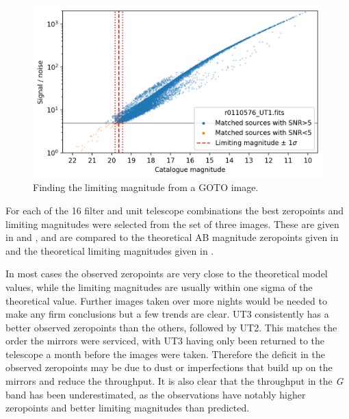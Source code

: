 \begin{colsection}
\begin{colsection}
\newpage

\begin{figure}[t]
    \begin{center}
        \includegraphics[width=\textwidth]{images/throughput/limiting_mag_real.png}
    \end{center}
    \caption[Finding the limiting magnitude from a GOTO image]{
        Finding the limiting magnitude from a GOTO image.
    }\label{fig:lim_mag}
\end{figure}

For each of the 16 filter and unit telescope combinations the best zeropoints and limiting magnitudes were selected from the set of three images. These are given in  and , and are compared to the theoretical AB magnitude zeropoints given in  and the theoretical limiting magnitudes given in .

In most cases the observed zeropoints are very close to the theoretical model values, while the limiting magnitudes are usually within one sigma of the theoretical value. Further images taken over more nights would be needed to make any firm conclusions but a few trends are clear. UT3 consistently has a better observed zeropoints than the others, followed by UT2. This matches the order the mirrors were serviced, with UT3 having only been returned to the telescope a month before the images were taken. Therefore the deficit in the observed zeropoints may be due to dust or imperfections that build up on the mirrors and reduce the throughput. It is also clear that the throughput in the \textit{G} band has been underestimated, as the observations have notably higher zeropoints and better limiting magnitudes than predicted.


\end{colsection}
\end{colsection}
